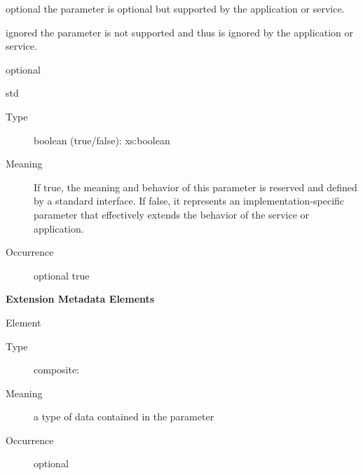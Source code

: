 \documentclass[11pt,a4paper]{ivoa}
\begin{document}
\begin{generated}
\begin{bigdescription}
\begin{description}
\begin{longtermsdescription}
\item[optional]
                  the parameter is optional but supported by the application or
                  service.
               
\item[ignored]
                  the parameter is not supported and thus is ignored by the 
                  application or service.
               
\end{longtermsdescription}
optional
\end{description}
\item[std]
\begin{description}
\item[Type] boolean (true/false): xs:boolean
\item[Meaning] 
                     If true, the meaning and behavior of this parameter is
                     reserved and defined by a standard interface.  If
                     false, it represents an implementation-specific
                     parameter that effectively extends the behavior of the 
                     service or application.  
                  
\item[Occurrence] optional
true
\end{description}


\end{bigdescription}\endgroup



\vspace{0.5ex}\noindent\textbf{ Extension Metadata Elements}

\begingroup\small\begin{bigdescription}\item[Element \xmlel{dataType}]
\begin{description}
\item[Type] composite: 
\item[Meaning] 
                        a type of data contained in the parameter
                     
\item[Occurrence] optional

\end{description}


\end{bigdescription}\endgroup

\endgroup
\end{generated}
\end{document}
